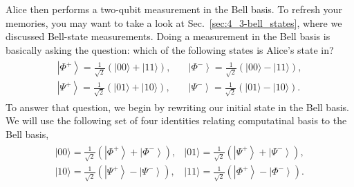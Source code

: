 Alice then performs a two-qubit measurement in the Bell basis.
To refresh your memories, you may want to take a look at Sec.~\ref{sec:4_3-bell_states}, where we discussed Bell-state measurements.
Doing a measurement in the Bell basis is basically asking the question: which of the following states is Alice's state in? 
\begin{align}
\begin{array}{ll}
    \left|\Phi^{+}\right\rangle=\frac{1}{\sqrt{2}}(|00\rangle+|11\rangle), \quad & \left|\Phi^{-}\right\rangle=\frac{1}{\sqrt{2}}(|00\rangle-|11\rangle), \\
    \left|\Psi^{+}\right\rangle=\frac{1}{\sqrt{2}}(|01\rangle+|10\rangle), \quad & \left|\Psi^{-}\right\rangle=\frac{1}{\sqrt{2}}(|01\rangle-|10\rangle).
\end{array}
\end{align}
To answer that question, we begin by rewriting our initial state in the Bell basis.
We will use the following set of four identities relating computatinal basis to the Bell basis,
\begin{align}
\begin{array}{ll}
    |00\rangle=\frac{1}{\sqrt{2}}\left(\left|\Phi^{+}\right\rangle+\left|\Phi^{-}\right\rangle\right), & |01\rangle=\frac{1}{\sqrt{2}}\left(\left|\Psi^{+}\right\rangle+\left|\Psi^{-}\right\rangle\right), \\
    |10\rangle=\frac{1}{\sqrt{2}}\left(\left|\Psi^{+}\right\rangle-\left|\Psi^{-}\right\rangle\right), & |11\rangle=\frac{1}{\sqrt{2}}\left(\left|\Phi^{+}\right\rangle-\left|\Phi^{-}\right\rangle\right).
\end{array}
\end{align}

